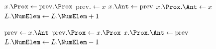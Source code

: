 \begin{function}[H]
\SetAlgoLined
\caption{Insere-Lista-DC($L$, prev, $x$)}
$x.\Prox \gets \mathrm{prev}.\Prox$ \;
prev.\Prox $\gets x$\;
$x.\Ant \gets \mathrm{prev}$\;
$x.\Prox.\Ant \gets x$\;
$L.\NumElem \gets L.\NumElem + 1$\;
\end{function}

\begin{function}[H]
\SetAlgoLined
\caption{Remove-Lista-DC($L$, $x$)}
$\mathrm{prev} \gets x.\Ant$\;
$\mathrm{prev}.\Prox \gets x.\Prox$\;
$x.\Prox.\Ant \gets \mathrm{prev}$\;
$L.\NumElem \gets L.\NumElem - 1$\;
\end{function}
